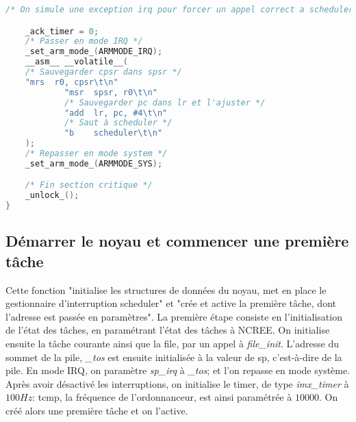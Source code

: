 \begin{lstlisting}[language=C, caption=noyau.c]
    /* On simule une exception irq pour forcer un appel correct a scheduler().*/

    _ack_timer = 0;
    /* Passer en mode IRQ */
    _set_arm_mode_(ARMMODE_IRQ);
    __asm__ __volatile__(
    /* Sauvegarder cpsr dans spsr */
    "mrs  r0, cpsr\t\n"
            "msr  spsr, r0\t\n"
            /* Sauvegarder pc dans lr et l'ajuster */
            "add  lr, pc, #4\t\n"
            /* Saut à scheduler */
            "b    scheduler\t\n"
    );
    /* Repasser en mode system */
    _set_arm_mode_(ARMMODE_SYS);

    /* Fin section critique */
    _unlock_();
}
\end{lstlisting}



\subsection{Démarrer le noyau et commencer une première tâche}
Cette fonction "initialise les structures de données du noyau, met en place le gestionnaire d’interruption scheduler" et "crée et active la première tâche, dont l’adresse est passée en paramètres".
La première étape consiste en l'initialisation de l'état des tâches, en paramétrant l'état des tâches à NCREE. On initialise ensuite la tâche courante ainsi que la file, par un appel à \textit{file\_init}. L'adresse du sommet de la pile, \textit{\_tos} est ensuite initialisée à la valeur de sp, c'est-à-dire de la pile. En mode IRQ, on paramètre \textit{sp\_irq} à \textit{\_tos}; et l'on repasse en mode système. Après avoir désactivé les interruptions, on initialise le timer, de type \textit{imx\_timer} à $100Hz$: tcmp, la fréquence de l'ordonnanceur, est ainsi paramétrée à $10000$. On créé alors une première tâche et on l'active.
